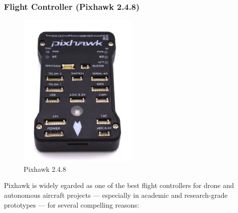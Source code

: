 \documentclass[12pt]{report}
\begin{document}
        \subsubsection{\large Flight Controller (Pixhawk 2.4.8)}
        \begin{figure}
          \includegraphics[width=1\linewidth]{pixhawk.png}
          \caption{Pixhawk 2.4.8}
          \label{fig:pixhawk}
        \end{figure}
        Pixhawk is widely egarded as one of the best flight controllers for drone and autonomous aircraft projects — especially in academic and research-grade prototypes — for several compelling reasons:
\end{document}
